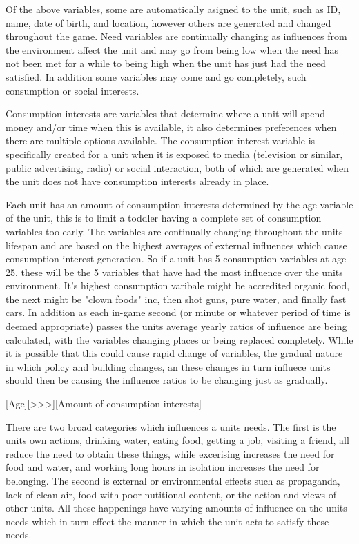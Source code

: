 Of the above variables, some are automatically asigned to the unit, such as ID, name, date of birth, and location, however others are generated and changed throughout the game. Need variables are continually changing as influences from the environment affect the unit and may go from being low when the need has not been met for a while to being high when the unit has just had the need satisfied. In addition some variables may come and go completely, such consumption or social interests. 

Consumption interests are variables that determine where a unit will spend money and/or time when this is available, it also determines preferences when there are multiple options available. The consumption interest variable is specifically created for a unit when it is exposed to media (television or similar, public advertising, radio) or social interaction, both of which are generated when the unit does not have consumption interests already in place. 

Each unit has an amount of consumption interests determined by the age variable of the unit, this is to limit a toddler having a complete set of consumption variables too early. The variables are continually changing throughout the units lifespan and are based on the highest averages of external influences which cause consumption interest generation. So if a unit has 5 consumption variables at age 25, these will be the 5 variables that have had the most influence over the units environment. It's highest consumption varibale might be accredited organic food, the next might be "clown foods" inc, then shot guns, pure water, and finally fast cars. In addition as each in-game second (or minute or whatever period of time is deemed appropriate) passes the units average yearly ratios of influence are being calculated, with the variables changing places or being replaced completely. While it is possible that this could cause rapid change of variables, the gradual nature in which policy and building changes, an these changes in turn influece units should then be causing the influence ratios to be changing just as gradually.   


[Age][>>>][Amount of consumption interests] 




There are two broad categories which influences a units needs. The first is the units own actions, drinking water, eating food, getting a job, visiting a friend, all reduce the need to obtain these things, while excerising increases the need for food and water, and working long hours in isolation increases the need for belonging. The second is external or environmental effects such as propaganda, lack of clean air, food with poor nutitional content, or the action and views of other units. All these happenings have varying amounts of influence on the units needs which in turn effect the manner in which the unit acts to satisfy these needs.


